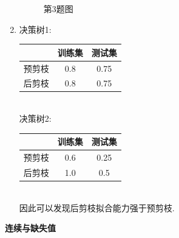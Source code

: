 \documentclass[answers]{exam}  %
\begin{document}
\begin{questions}
\begin{solution}
\begin{enumerate}
\begin{figure}[H]
                      \caption{第3题图}
                  \end{figure}
            \item 决策树1:
                  \begin{tabular}{c|c|c}
                                    & 训练集 & 测试集 \\
                      \hline 预剪枝 & 0.8    & 0.75   \\
                      后剪枝        & 0.8    & 0.75   \\
                  \end{tabular}\\
                  决策树2:
                  \begin{tabular}{c|c|c}
                                    & 训练集 & 测试集 \\
                      \hline 预剪枝 & 0.6    & 0.25   \\
                      后剪枝        & 1.0    & 0.5    \\
                  \end{tabular}\\
                  因此可以发现后剪枝拟合能力强于预剪枝.
        \end{enumerate}
    \end{solution}

    \question [20] \textbf{连续与缺失值}




\end{questions}
\end{document}
